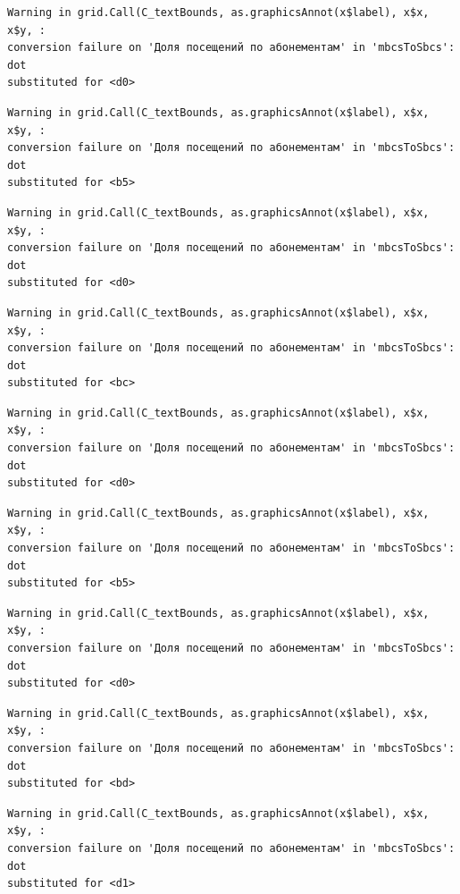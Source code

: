 \documentclass[
  letterpaper,
  DIV=11,
  numbers=noendperiod]{scrartcl}
\begin{document}
\begin{verbatim}
Warning in grid.Call(C_textBounds, as.graphicsAnnot(x$label), x$x, x$y, :
conversion failure on 'Доля посещений по абонементам' in 'mbcsToSbcs': dot
substituted for <d0>
\end{verbatim}

\begin{verbatim}
Warning in grid.Call(C_textBounds, as.graphicsAnnot(x$label), x$x, x$y, :
conversion failure on 'Доля посещений по абонементам' in 'mbcsToSbcs': dot
substituted for <b5>
\end{verbatim}

\begin{verbatim}
Warning in grid.Call(C_textBounds, as.graphicsAnnot(x$label), x$x, x$y, :
conversion failure on 'Доля посещений по абонементам' in 'mbcsToSbcs': dot
substituted for <d0>
\end{verbatim}

\begin{verbatim}
Warning in grid.Call(C_textBounds, as.graphicsAnnot(x$label), x$x, x$y, :
conversion failure on 'Доля посещений по абонементам' in 'mbcsToSbcs': dot
substituted for <bc>
\end{verbatim}

\begin{verbatim}
Warning in grid.Call(C_textBounds, as.graphicsAnnot(x$label), x$x, x$y, :
conversion failure on 'Доля посещений по абонементам' in 'mbcsToSbcs': dot
substituted for <d0>
\end{verbatim}

\begin{verbatim}
Warning in grid.Call(C_textBounds, as.graphicsAnnot(x$label), x$x, x$y, :
conversion failure on 'Доля посещений по абонементам' in 'mbcsToSbcs': dot
substituted for <b5>
\end{verbatim}

\begin{verbatim}
Warning in grid.Call(C_textBounds, as.graphicsAnnot(x$label), x$x, x$y, :
conversion failure on 'Доля посещений по абонементам' in 'mbcsToSbcs': dot
substituted for <d0>
\end{verbatim}

\begin{verbatim}
Warning in grid.Call(C_textBounds, as.graphicsAnnot(x$label), x$x, x$y, :
conversion failure on 'Доля посещений по абонементам' in 'mbcsToSbcs': dot
substituted for <bd>
\end{verbatim}

\begin{verbatim}
Warning in grid.Call(C_textBounds, as.graphicsAnnot(x$label), x$x, x$y, :
conversion failure on 'Доля посещений по абонементам' in 'mbcsToSbcs': dot
substituted for <d1>
\end{verbatim}
\end{document}
